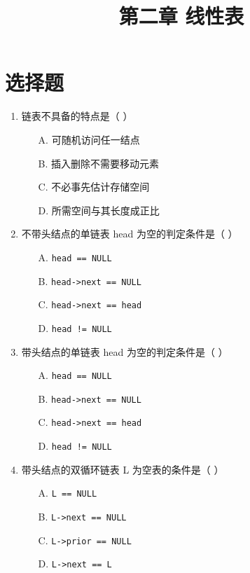 \documentclass[12pt, a4paper]{article}
\title{\textbf{第二章 线性表}}
\author{}
\date{}
\begin{document}
\section*{选择题}

\begin{enumerate}[label=\arabic*.]
	\item 链表不具备的特点是（ ）
	      \begin{enumerate}
		      \item[A.] 可随机访问任一结点
		      \item[B.] 插入删除不需要移动元素
		      \item[C.] 不必事先估计存储空间
		      \item[D.] 所需空间与其长度成正比
	      \end{enumerate}

	\item 不带头结点的单链表 head 为空的判定条件是（ ）
	      \begin{enumerate}
		      \item[A.] \texttt{head == NULL}
		      \item[B.] \texttt{head->next == NULL}
		      \item[C.] \texttt{head->next == head}
		      \item[D.] \texttt{head != NULL}
	      \end{enumerate}

	\item 带头结点的单链表 head 为空的判定条件是（ ）
	      \begin{enumerate}
		      \item[A.] \texttt{head == NULL}
		      \item[B.] \texttt{head->next == NULL}
		      \item[C.] \texttt{head->next == head}
		      \item[D.] \texttt{head != NULL}
	      \end{enumerate}

	\item 带头结点的双循环链表 L 为空表的条件是（ ）
	      \begin{enumerate}
		      \item[A.] \texttt{L == NULL}
		      \item[B.] \texttt{L->next == NULL}
		      \item[C.] \texttt{L->prior == NULL}
		      \item[D.] \texttt{L->next == L}
	      \end{enumerate}


\end{enumerate}
\end{document}
